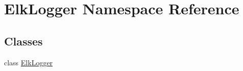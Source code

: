 \hypertarget{namespace_elk_logger}{\section{Elk\-Logger Namespace Reference}
\label{namespace_elk_logger}
}
\subsection*{Classes}
\begin{DoxyCompactItemize}
\item 
class \hyperlink{class_elk_logger_1_1_elk_logger}{Elk\-Logger}
\end{DoxyCompactItemize}
